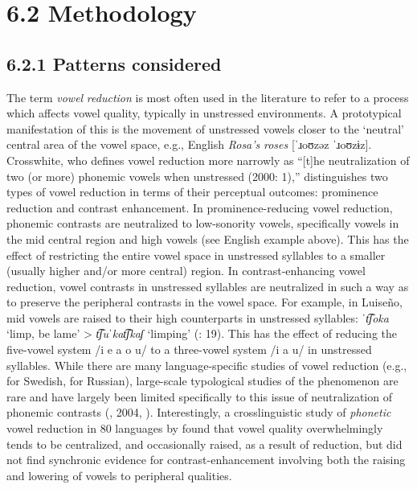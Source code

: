 \section{6.2  Methodology}
\subsection{6.2.1  Patterns considered}

  The term \textit{vowel} \textit{reduction} is most often used in the literature to refer to a process which affects vowel quality, typically in unstressed environments. A prototypical manifestation of this is the movement of unstressed vowels closer to the ‘neutral’ central area of the vowel space, e.g., English \textit{Rosa’s} \textit{roses} [\textit{ˈ}ɹoʊzəz \textit{ˈ}ɹoʊzɨz]. Crosswhite, who defines vowel reduction more narrowly as “[t]he neutralization of two (or more) phonemic vowels when unstressed (2000: 1),” distinguishes two types of vowel reduction in terms of their perceptual outcomes: prominence reduction and contrast enhancement. In prominence-reducing vowel reduction, phonemic contrasts are neutralized to low-sonority vowels, specifically vowels in the mid central region and high vowels (see English example above). This has the effect of restricting the entire vowel space in unstressed syllables to a smaller (usually higher and/or more central) region. In contrast-enhancing vowel reduction, vowel contrasts in unstressed syllables are neutralized in such a way as to preserve the peripheral contrasts in the vowel space. For example, in Luiseño, mid vowels are raised to their high counterparts in unstressed syllables: \textit{ˈt͡ʃoka} ‘limp, be lame’ > \textit{t͡ʃuˈkat͡ʃkaʃ} ‘limping’ (\citealt{MunroBenson1973}: 19). This has the effect of reducing the five-vowel system /i e a o u/ to a three-vowel system /i a u/ in unstressed syllables. While there are many language-specific studies of vowel reduction (e.g., \citealt{Lindblom1963} for Swedish, \citealt{PadgettTabain2005} for Russian), large-scale typological studies of the phenomenon are rare and have largely been limited specifically to this issue of neutralization of phonemic contrasts (\citealt{Crosswhite2001}, 2004, \citealt{Barnes2006}). Interestingly, a crosslinguistic study of \textit{phonetic} vowel reduction in 80 languages by \citet{KapatsinskiEtAl2019} found that vowel quality overwhelmingly tends to be centralized, and occasionally raised, as a result of reduction, but did not find synchronic evidence for contrast-enhancement involving both the raising and lowering of vowels to peripheral qualities.

